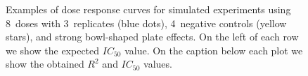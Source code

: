\begin{figure}[!htb]
  \caption{Examples of dose response curves for simulated experiments
    using 8~doses with 3~replicates (blue dots), 4~negative controls
    (yellow stars), and strong bowl-shaped plate effects. On the left
    of each row we show the expected $IC_{50}$ value. On the caption
    below each plot we show the obtained $R^2$ and $IC_{50}$ values.}
  \label{fig:dose-response-curves} 
\end{figure}








